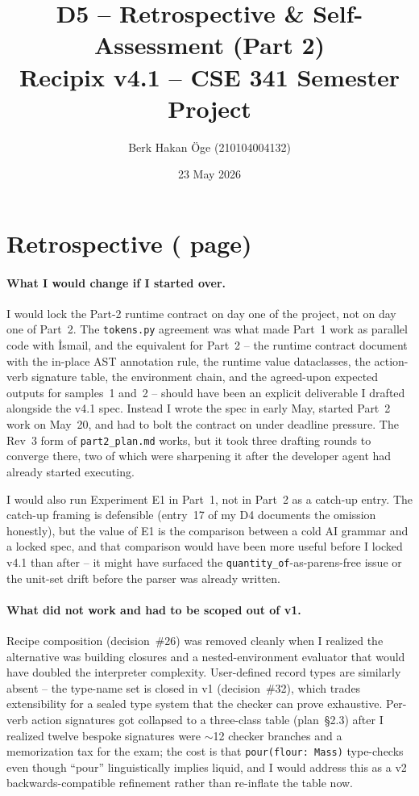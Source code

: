 \documentclass[11pt,a4paper]{article}
\title{\textbf{D5 -- Retrospective \& Self-Assessment (Part 2)} \\
       \large Recipix v4.1 -- CSE 341 Semester Project}
\author{Berk Hakan \"Oge (210104004132)}
\date{23 May 2026}
\begin{document}
\maketitle
\thispagestyle{fancy}


\section{Retrospective (\textonehalf{} page)}

\paragraph{What I would change if I started over.}
I would lock the Part-2 runtime contract on day one of the project,
not on day one of Part~2. The \texttt{tokens.py} agreement was what
made Part~1 work as parallel code with İsmail, and the equivalent for
Part~2 -- the runtime contract document with the in-place AST
annotation rule, the runtime value dataclasses, the action-verb
signature table, the environment chain, and the agreed-upon expected
outputs for samples~1 and~2 -- should have been an explicit
deliverable I drafted alongside the v4.1 spec. Instead I wrote the
spec in early May, started Part~2 work on May~20, and had to bolt the
contract on under deadline pressure. The Rev~3 form of
\texttt{part2\_plan.md} works, but it took three drafting rounds to
converge there, two of which were sharpening it after the developer
agent had already started executing.

I would also run Experiment E1 in Part~1, not in Part~2 as a catch-up
entry. The catch-up framing is defensible (entry~17 of my D4 documents
the omission honestly), but the value of E1 is the comparison between
a cold AI grammar and a locked spec, and that comparison would have
been more useful before I locked v4.1 than after -- it might have
surfaced the \texttt{quantity\_of}-as-parens-free issue or the unit-set
drift before the parser was already written.

\paragraph{What did not work and had to be scoped out of v1.}
Recipe composition (decision~\#26) was removed cleanly when I realized
the alternative was building closures and a nested-environment
evaluator that would have doubled the interpreter complexity.
User-defined record types are similarly absent -- the type-name set is
closed in v1 (decision~\#32), which trades extensibility for a sealed
type system that the checker can prove exhaustive. Per-verb action
signatures got collapsed to a three-class table (plan~\S2.3) after I
realized twelve bespoke signatures were $\sim$12 checker branches and
a memorization tax for the exam; the cost is that
\texttt{pour(flour:~Mass)} type-checks even though ``pour''
linguistically implies liquid, and I would address this as a v2
backwards-compatible refinement rather than re-inflate the table now.
\end{document}
